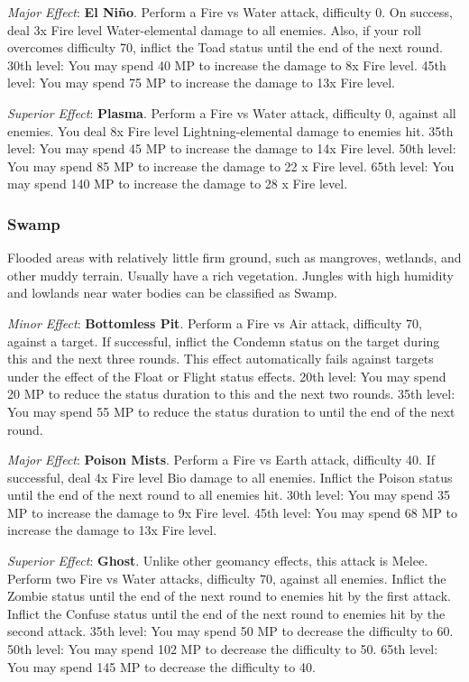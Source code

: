 \begin{multicols}{2}
	\textit{Major Effect}: \textbf{El Niño}. Perform a Fire vs Water attack, difficulty 0. On success, deal 3x Fire level Water-elemental damage to all enemies. Also, if your roll overcomes difficulty 70, inflict the Toad status until the end of the next round. 30th level: You may spend 40 MP to increase the damage to 8x Fire level. 45th level: You may spend 75 MP to increase the damage to 13x Fire level.

	\textit{Superior Effect}: \textbf{Plasma}. Perform a Fire vs Water attack, difficulty 0, against all enemies. You deal 8x Fire level Lightning-elemental damage to enemies hit. 35th level: You may spend 45 MP to increase the damage to 14x Fire level. 50th level: You may spend 85 MP to increase the damage to 22 x Fire level. 65th level: You may spend 140 MP to increase the damage to 28 x Fire level.

    \subsubsection{Swamp}

    Flooded areas with relatively little firm ground, such as mangroves, wetlands, and other muddy terrain. Usually have a rich vegetation. Jungles with high humidity and lowlands near water bodies can be classified as Swamp.

	\textit{Minor Effect}: \textbf{Bottomless Pit}. Perform a Fire vs Air attack, difficulty 70, against a target. If successful, inflict the Condemn status on the target during this and the next three rounds. This effect automatically fails against targets under the effect of the Float or Flight status effects. 20th level: You may spend 20 MP to reduce the status duration to this and the next two rounds. 35th level: You may spend 55 MP to reduce the status duration to until the end of the next round.

	\textit{Major Effect}: \textbf{Poison Mists}. Perform a Fire vs Earth attack, difficulty 40. If successful, deal 4x Fire level Bio damage to all enemies. Inflict the Poison status until the end of the next round to all enemies hit. 30th level: You may spend 35 MP to increase the damage to 9x Fire level. 45th level: You may spend 68 MP to increase the damage to 13x Fire level.

	\textit{Superior Effect}: \textbf{Ghost}. Unlike other geomancy effects, this attack is Melee. Perform two Fire vs Water attacks, difficulty 70, against all enemies. Inflict the Zombie status until the end of the next round to enemies hit by the first attack. Inflict the Confuse status until the end of the next round to enemies hit by the second attack. 35th level: You may spend 50 MP to decrease the difficulty to 60. 50th level: You may spend 102 MP to decrease the difficulty to 50. 65th level: You may spend 145 MP to decrease the difficulty to 40.


\end{multicols}
